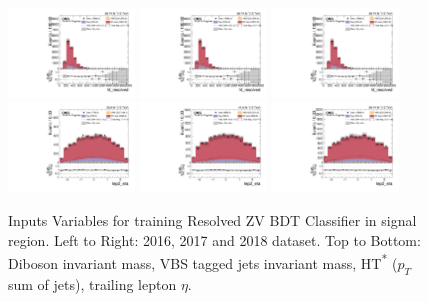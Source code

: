 \begin{figure}[!ht]
  \includegraphics[width=0.30\textwidth]{analysis_plots/2018_zjj/cr_vjets_l/ht_resolved.pdf} \hspace{-10pt}
  \includegraphics[width=0.30\textwidth]{analysis_plots/2018_zjj/cr_vjets_l/ht_resolved.pdf} \hspace{-10pt}
  \includegraphics[width=0.30\textwidth]{analysis_plots/2018_zjj/cr_vjets_l/ht_resolved.pdf} \hspace{-10pt} \\
  \includegraphics[width=0.30\textwidth]{analysis_plots/2016_zjj/cr_vjets_l/lep2_eta.pdf} \hspace{-10pt}
  \includegraphics[width=0.30\textwidth]{analysis_plots/2017_zjj/cr_vjets_l/lep2_eta.pdf} \hspace{-10pt}
  \includegraphics[width=0.30\textwidth]{analysis_plots/2018_zjj/cr_vjets_l/lep2_eta.pdf} \hspace{-10pt}
  \caption[Inputs Variables for training Resolved ZV BDT Classifier in signal region.]%
  {Inputs Variables for training Resolved ZV BDT Classifier in signal region.
    Left to Right: 2016, 2017 and 2018 dataset.
    Top to Bottom: Diboson invariant mass, VBS tagged jets invariant mass,
    HT\textsuperscript{*} (\( p_{T} \) sum of jets), trailing lepton \( \eta \).}%
  \label{fig:vbs-training-input-zjj-sr}
\end{figure}


